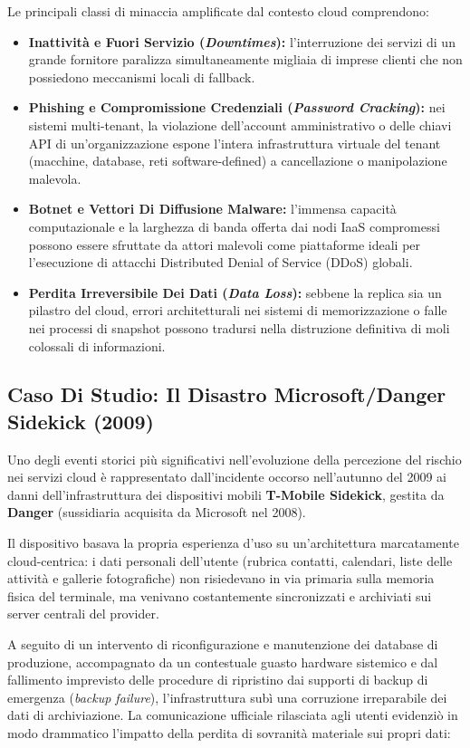 \documentclass[11pt, a4paper]{article}
\begin{document}
Le principali classi di minaccia amplificate dal contesto cloud comprendono:
\begin{itemize}
    \item \textbf{Inattività e Fuori Servizio (\emph{Downtimes}):} l'interruzione dei servizi di un grande fornitore paralizza simultaneamente migliaia di imprese clienti che non possiedono meccanismi locali di fallback.
    \item \textbf{Phishing e Compromissione Credenziali (\emph{Password Cracking}):} nei sistemi multi-tenant, la violazione dell'account amministrativo o delle chiavi API di un'organizzazione espone l'intera infrastruttura virtuale del tenant (macchine, database, reti software-defined) a cancellazione o manipolazione malevola.
    \item \textbf{Botnet e Vettori Di Diffusione Malware:} l'immensa capacità computazionale e la larghezza di banda offerta dai nodi IaaS compromessi possono essere sfruttate da attori malevoli come piattaforme ideali per l'esecuzione di attacchi Distributed Denial of Service (DDoS) globali.
    \item \textbf{Perdita Irreversibile Dei Dati (\emph{Data Loss}):} sebbene la replica sia un pilastro del cloud, errori architetturali nei sistemi di memorizzazione o falle nei processi di snapshot possono tradursi nella distruzione definitiva di moli colossali di informazioni.
\end{itemize}

\subsection{Caso Di Studio: Il Disastro Microsoft/Danger Sidekick (2009)}

Uno degli eventi storici più significativi nell'evoluzione della percezione del rischio nei servizi cloud è rappresentato dall'incidente occorso nell'autunno del 2009 ai danni dell'infrastruttura dei dispositivi mobili \textbf{T-Mobile Sidekick}, gestita da \textbf{Danger} (sussidiaria acquisita da Microsoft nel 2008).

Il dispositivo basava la propria esperienza d'uso su un'architettura marcatamente cloud-centrica: i dati personali dell'utente (rubrica contatti, calendari, liste delle attività e gallerie fotografiche) non risiedevano in via primaria sulla memoria fisica del terminale, ma venivano costantemente sincronizzati e archiviati sui server centrali del provider.

A seguito di un intervento di riconfigurazione e manutenzione dei database di produzione, accompagnato da un contestuale guasto hardware sistemico e dal fallimento imprevisto delle procedure di ripristino dai supporti di backup di emergenza (\emph{backup failure}), l'infrastruttura subì una corruzione irreparabile dei dati di archiviazione. La comunicazione ufficiale rilasciata agli utenti evidenziò in modo drammatico l'impatto della perdita di sovranità materiale sui propri dati:
\end{document}
